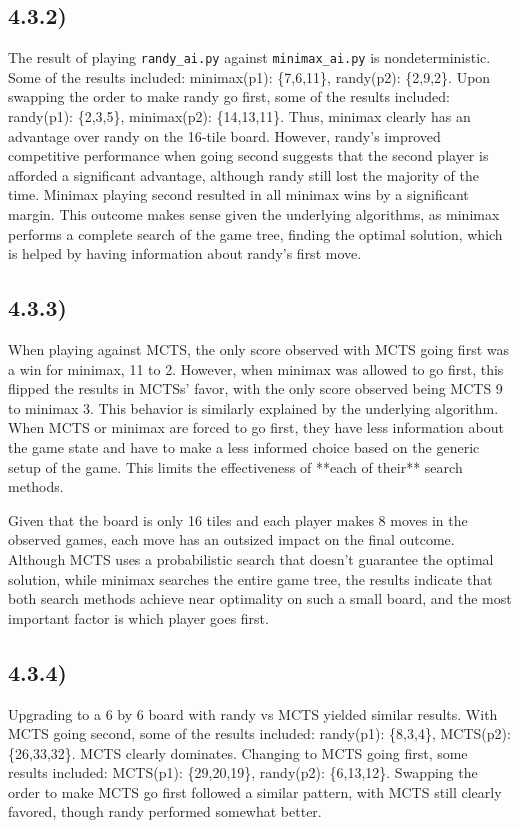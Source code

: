 \documentclass[11pt]{article}
\begin{document}
\subsection*{4.3.2)}
The result of playing \texttt{randy\_ai.py} against \texttt{minimax\_ai.py} is nondeterministic. Some of the results included:
minimax(p1): \{7,6,11\}, randy(p2): \{2,9,2\}. Upon swapping the order to make randy go first, some of the results included:
randy(p1): \{2,3,5\}, minimax(p2): \{14,13,11\}.
Thus, minimax clearly has an advantage over randy on the 16‐tile board. However, randy's improved competitive performance when going second
suggests that the second player is afforded a significant advantage, although randy still lost the majority of the time. Minimax playing second resulted in all
minimax wins by a significant margin. This outcome makes sense given the underlying algorithms, as minimax performs a complete search of the game tree,
finding the optimal solution, which is helped by having information about randy's first move.

\subsection*{4.3.3)}
When playing against MCTS, the only score observed with MCTS going first was a win for minimax, 11 to 2. However, when minimax was allowed to go first, this
flipped the results in MCTSs' favor, with the only score observed being MCTS 9 to minimax 3. This behavior is similarly explained by the underlying algorithm. When MCTS or minimax are
forced to go first, they have less information about the game state and have to make a less informed choice based on the generic setup of the game. This limits
the effectiveness of **each of their** search methods.

Given that the board is only 16 tiles and each player makes 8 moves in the observed games, each move
has an outsized impact on the final outcome. Although MCTS uses a probabilistic search that doesn't guarantee the optimal solution, while minimax searches the entire game tree,
the results indicate that both search methods achieve near optimality on such a small board, and the most important factor is which player goes first.

\subsection*{4.3.4)}
Upgrading to a 6 by 6 board with randy vs MCTS yielded similar results. With MCTS going second, some of the results included:
randy(p1): \{8,3,4\}, MCTS(p2): \{26,33,32\}. MCTS clearly dominates. Changing to MCTS going first, some results included:
MCTS(p1): \{29,20,19\}, randy(p2): \{6,13,12\}. Swapping the order to make MCTS go first followed a similar pattern,
with MCTS still clearly favored, though randy performed somewhat better.
\end{document}
